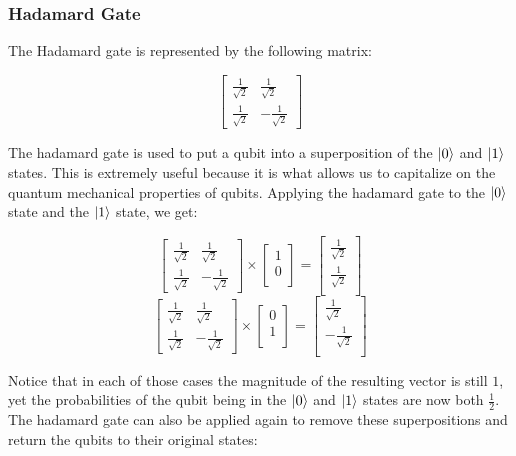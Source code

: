 \documentclass{article}
\begin{document}
\subsubsection{Hadamard Gate}
\label{sec:hadamardgate}

The Hadamard gate is represented by the following matrix:

\[
	\begin{bmatrix}
		\frac{1}{\sqrt{2}} & \frac{1}{\sqrt{2}} \\
		\frac{1}{\sqrt{2}} & -\frac{1}{\sqrt{2}}
	\end{bmatrix}
\]

The hadamard gate is used to put a qubit into a superposition of the $\ket{0}$ and $\ket{1}$ states. This is extremely useful because it is what allows us to capitalize on the
quantum mechanical properties of qubits. Applying the hadamard gate to the $\ket{0}$ state and the $\ket{1}$ state, we get:

\[
	\begin{bmatrix}
		\frac{1}{\sqrt{2}} & \frac{1}{\sqrt{2}} \\
		\frac{1}{\sqrt{2}} & -\frac{1}{\sqrt{2}}
	\end{bmatrix}
	\times
	\begin{bmatrix}
		1 \\
		0 \\
	\end{bmatrix}
	=
	\begin{bmatrix}
		\frac{1}{\sqrt{2}} \\
		\frac{1}{\sqrt{2}} \\
	\end{bmatrix}
\]
\[
	\begin{bmatrix}
		\frac{1}{\sqrt{2}} & \frac{1}{\sqrt{2}} \\
		\frac{1}{\sqrt{2}} & -\frac{1}{\sqrt{2}}
	\end{bmatrix}
	\times
	\begin{bmatrix}
		0 \\
		1 \\
	\end{bmatrix}
	=
	\begin{bmatrix}
		\frac{1}{\sqrt{2}} \\
		-\frac{1}{\sqrt{2}} \\
	\end{bmatrix}
\]

Notice that in each of those cases the magnitude of the resulting vector is still $1$, yet the probabilities of the qubit being in the $\ket{0}$ and $\ket{1}$ states are now
both $ \frac{1}{2}$. The hadamard gate can also be applied again to remove these superpositions and return the qubits to their original states:
\end{document}
